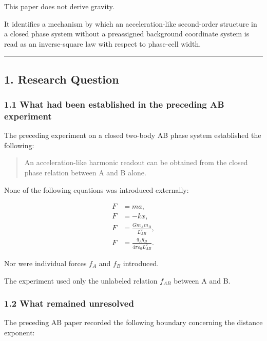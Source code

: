 \documentclass[
  10pt,
  a4paper,
]{article}
\begin{document}
This paper does not derive gravity.

It identifies a mechanism by which an acceleration-like second-order
structure in a closed phase system without a preassigned background
coordinate system is read as an inverse-square law with respect to
phase-cell width.

\begin{center}\rule{0.5\linewidth}{0.5pt}\end{center}

\subsection{1. Research Question}\label{research-question}

\subsubsection{1.1 What had been established in the preceding AB
experiment}\label{what-had-been-established-in-the-preceding-ab-experiment}

The preceding experiment on a closed two-body AB phase system
established the following:

\begin{quote}
An acceleration-like harmonic readout can be obtained from the closed
phase relation between A and B alone.
\end{quote}

None of the following equations was introduced externally:

\[
\begin{aligned}
F&=ma,\\
F&=-kx,\\
F&=\frac{Gm_A m_B}{L_{AB}^2},\\
F&=\frac{q_Aq_B}{4\pi\varepsilon_0L_{AB}^2}.
\end{aligned}
\]

Nor were individual forces \(f_A\) and \(f_B\) introduced.

The experiment used only the unlabeled relation \(f_{AB}\) between A and
B.

\subsubsection{1.2 What remained
unresolved}\label{what-remained-unresolved}

The preceding AB paper recorded the following boundary concerning the
distance exponent:
\end{document}

